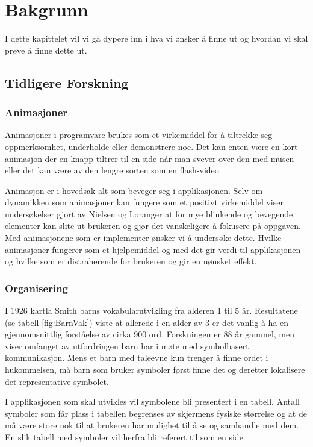 
\chapter{Bakgrunn}
I dette kapittelet vil vi gå dypere inn i hva vi ønsker å finne ut og hvordan vi skal prøve å finne dette ut. 

\section{Tidligere Forskning}


\subsection{Animasjoner}


Animasjoner i programvare brukes som et virkemiddel for å tiltrekke seg oppmerksomhet, underholde eller demonstrere noe. Det kan enten være en kort animasjon der en knapp tiltrer til en side når man svever over den med musen eller det kan være av den lengre sorten som en flash-video.  

Animasjon er i hovedsak alt som beveger seg i applikasjonen. Selv om dynamikken som animasjoner kan fungere som et positivt virkemiddel viser undersøkelser gjort av Nielsen og Loranger \cite{NielsenBok}  at for mye blinkende og bevegende elementer kan slite ut brukeren og gjør det vanskeligere å fokusere på oppgaven. Med animasjonene som er implementer ønsker vi å undersøke dette. Hvilke animasjoner fungerer som et hjelpemiddel og med det gir verdi til applikasjonen og hvilke som er distraherende for brukeren og gir en uønsket effekt. 
 


\subsection{Organisering}

I 1926 kartla Smith\cite{Smith} barns vokabularutvikling fra alderen 1 til 5 år. Resultatene (se tabell \ref{fig:BarnVak}) viste at allerede i en alder av 3 er det vanlig å ha en gjennomsnittlig forståelse av cirka 900 ord. Forskningen er 88 år gammel, men viser omfanget av utfordringen barn har i møte med symbolbasert kommunikasjon. Mens et barn med taleevne kun trenger å finne ordet i hukommelsen, må barn som bruker symboler først finne det og deretter lokalisere det representative symbolet. 

I applikasjonen som skal utvikles vil symbolene bli presentert i en tabell. Antall symboler som får plass i tabellen begrenses av skjermens fysiske størrelse og at de må være store nok til at brukeren har mulighet til å se  og samhandle med dem. En slik tabell med symboler vil herfra bli referert til som en side. 

